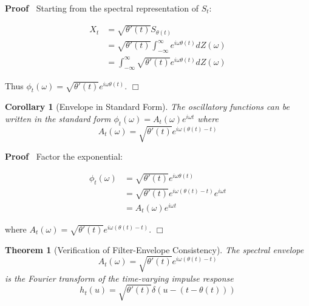 \documentclass{article}
\newenvironment{proof}{\noindent\textbf{Proof\ }}{\hspace*{\fill}$\Box$\medskip}
\newtheorem{corollary}{Corollary}
\newtheorem{theorem}{Theorem}
\begin{document}
\begin{proof}
  Starting from the spectral representation of $S_t$:
  
  \begin{align}
    X_t & = \sqrt{\theta' (t)} S_{\theta (t)} \\
    & = \sqrt{\theta' (t)}  \int_{- \infty}^{\infty} e^{i \omega \theta (t)}
    dZ (\omega) \\
    & = \int_{- \infty}^{\infty} \sqrt{\theta' (t)} e^{i \omega \theta (t)}
    dZ (\omega) 
  \end{align}
  
  Thus $\phi_t (\omega) = \sqrt{\theta' (t)} e^{i \omega \theta (t)}$.
\end{proof}

\begin{corollary}
  [Envelope in Standard Form] The oscillatory functions can be written in the
  standard form $\phi_t (\omega) = A_t (\omega) e^{i \omega t}$ where
  \[ A_t (\omega) = \sqrt{\theta' (t)} e^{i \omega (\theta (t) - t)} \]
\end{corollary}

\begin{proof}
  Factor the exponential:
  
  \begin{align}
    \phi_t (\omega) & = \sqrt{\theta' (t)} e^{i \omega \theta (t)} \\
    & = \sqrt{\theta' (t)} e^{i \omega (\theta (t) - t)} e^{i \omega t} \\
    & = A_t (\omega) e^{i \omega t} 
  \end{align}
  
  where $A_t (\omega) = \sqrt{\theta' (t)} e^{i \omega (\theta (t) - t)}$.
\end{proof}

\begin{theorem}
  [Verification of Filter-Envelope Consistency] The spectral envelope
  \begin{equation}
    A_t (\omega) = \sqrt{\theta' (t)} e^{i \omega (\theta (t) - t)}
  \end{equation}
  is the Fourier transform of the time-varying impulse response
  \begin{equation}
    h_t (u) = \sqrt{\theta' (t)} \delta (u - (t - \theta (t)))
  \end{equation}
\end{theorem}
\end{document}
